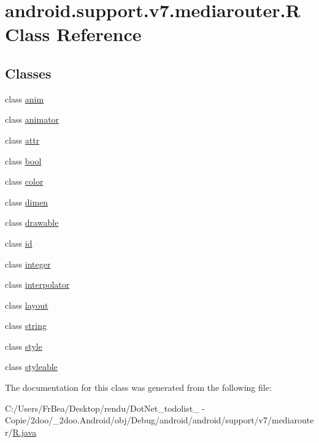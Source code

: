 \hypertarget{classandroid_1_1support_1_1v7_1_1mediarouter_1_1_r}{
\section{android.support.v7.mediarouter.R Class Reference}
\label{classandroid_1_1support_1_1v7_1_1mediarouter_1_1_r}
}
\subsection*{Classes}
\begin{CompactItemize}
\item 
class \hyperlink{classandroid_1_1support_1_1v7_1_1mediarouter_1_1_r_1_1anim}{anim}
\item 
class \hyperlink{classandroid_1_1support_1_1v7_1_1mediarouter_1_1_r_1_1animator}{animator}
\item 
class \hyperlink{classandroid_1_1support_1_1v7_1_1mediarouter_1_1_r_1_1attr}{attr}
\item 
class \hyperlink{classandroid_1_1support_1_1v7_1_1mediarouter_1_1_r_1_1bool}{bool}
\item 
class \hyperlink{classandroid_1_1support_1_1v7_1_1mediarouter_1_1_r_1_1color}{color}
\item 
class \hyperlink{classandroid_1_1support_1_1v7_1_1mediarouter_1_1_r_1_1dimen}{dimen}
\item 
class \hyperlink{classandroid_1_1support_1_1v7_1_1mediarouter_1_1_r_1_1drawable}{drawable}
\item 
class \hyperlink{classandroid_1_1support_1_1v7_1_1mediarouter_1_1_r_1_1id}{id}
\item 
class \hyperlink{classandroid_1_1support_1_1v7_1_1mediarouter_1_1_r_1_1integer}{integer}
\item 
class \hyperlink{classandroid_1_1support_1_1v7_1_1mediarouter_1_1_r_1_1interpolator}{interpolator}
\item 
class \hyperlink{classandroid_1_1support_1_1v7_1_1mediarouter_1_1_r_1_1layout}{layout}
\item 
class \hyperlink{classandroid_1_1support_1_1v7_1_1mediarouter_1_1_r_1_1string}{string}
\item 
class \hyperlink{classandroid_1_1support_1_1v7_1_1mediarouter_1_1_r_1_1style}{style}
\item 
class \hyperlink{classandroid_1_1support_1_1v7_1_1mediarouter_1_1_r_1_1styleable}{styleable}
\end{CompactItemize}


The documentation for this class was generated from the following file:\begin{CompactItemize}
\item 
C:/Users/FrBea/Desktop/rendu/DotNet\_\-todolist\_ - Copie/2doo/\_\-2doo.Android/obj/Debug/android/android/support/v7/mediarouter/\hyperlink{android_2support_2v7_2mediarouter_2_r_8java}{R.java}\end{CompactItemize}
